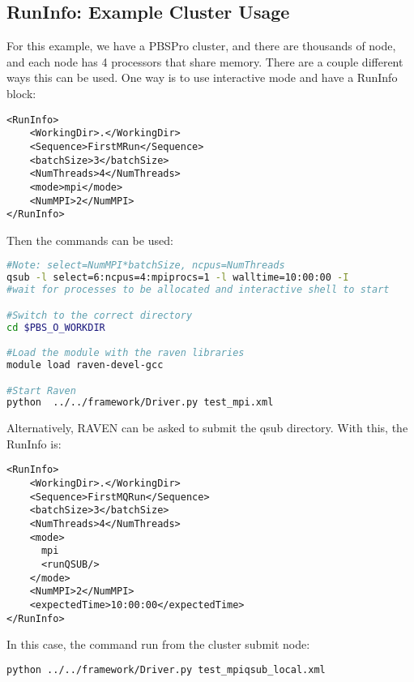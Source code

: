 \subsection{RunInfo: Example Cluster Usage}
\label{subsec:runinfoclusterexample}

For this example, we have a PBSPro cluster, and there are thousands of
node, and each node has 4 processors that share memory.  There are a
couple different ways this can be used.  One way is to use interactive
mode and have a RunInfo block:

\begin{lstlisting}[style=XML]
<RunInfo>
    <WorkingDir>.</WorkingDir>
    <Sequence>FirstMRun</Sequence>
    <batchSize>3</batchSize>
    <NumThreads>4</NumThreads>
    <mode>mpi</mode>
    <NumMPI>2</NumMPI>
</RunInfo>
\end{lstlisting}

Then the commands can be used:

\begin{lstlisting}[language=bash]
#Note: select=NumMPI*batchSize, ncpus=NumThreads
qsub -l select=6:ncpus=4:mpiprocs=1 -l walltime=10:00:00 -I
#wait for processes to be allocated and interactive shell to start

#Switch to the correct directory
cd $PBS_O_WORKDIR

#Load the module with the raven libraries
module load raven-devel-gcc

#Start Raven
python  ../../framework/Driver.py test_mpi.xml
\end{lstlisting}

Alternatively, RAVEN can be asked to submit the qsub directory.  With
this, the RunInfo is:

\begin{lstlisting}[style=XML]
<RunInfo>
    <WorkingDir>.</WorkingDir>
    <Sequence>FirstMQRun</Sequence>
    <batchSize>3</batchSize>
    <NumThreads>4</NumThreads>
    <mode>
      mpi
      <runQSUB/>
    </mode>
    <NumMPI>2</NumMPI>
    <expectedTime>10:00:00</expectedTime>
</RunInfo>
\end{lstlisting}

In this case, the command run from the cluster submit node:

\begin{lstlisting}[language=bash]
python ../../framework/Driver.py test_mpiqsub_local.xml
\end{lstlisting}

